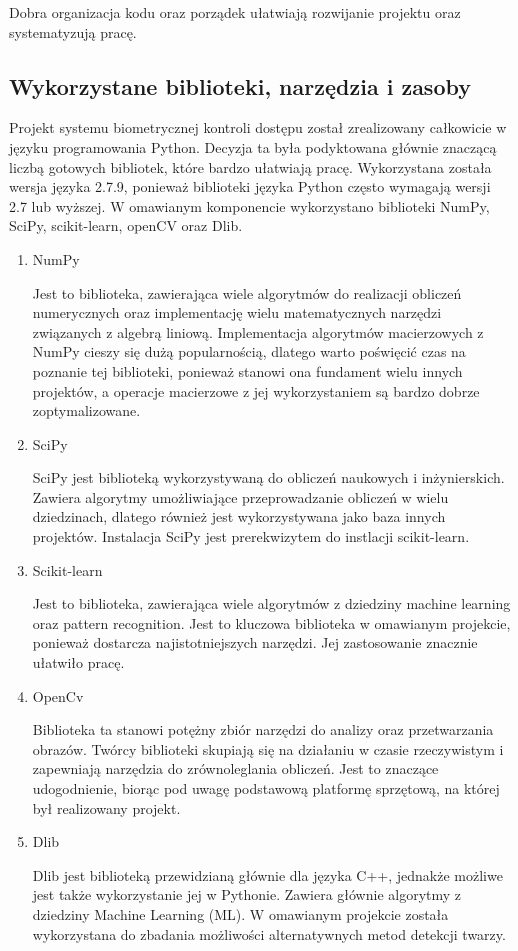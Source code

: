 \documentclass[oneside, eng]{mgr}
\begin{document}
Dobra organizacja kodu oraz porządek ułatwiają rozwijanie projektu oraz systematyzują pracę. 

\subsection{Wykorzystane biblioteki, narzędzia i zasoby}
Projekt systemu biometrycznej kontroli dostępu został zrealizowany całkowicie w języku programowania Python. Decyzja ta była podyktowana głównie znaczącą liczbą gotowych bibliotek, które bardzo ułatwiają pracę. Wykorzystana została wersja języka 2.7.9, ponieważ biblioteki języka Python często wymagają wersji 2.7 lub wyższej. W omawianym komponencie wykorzystano biblioteki NumPy, SciPy, scikit-learn, openCV oraz Dlib.
\begin{enumerate}
\item NumPy

Jest to biblioteka, zawierająca wiele algorytmów do realizacji obliczeń numerycznych oraz implementację wielu matematycznych narzędzi związanych z algebrą liniową. Implementacja algorytmów macierzowych z NumPy cieszy się dużą popularnością, dlatego warto poświęcić czas na poznanie tej biblioteki, ponieważ stanowi ona fundament wielu innych projektów, a operacje macierzowe z jej wykorzystaniem są bardzo dobrze zoptymalizowane.

\item SciPy

SciPy jest biblioteką wykorzystywaną do obliczeń naukowych i inżynierskich. Zawiera algorytmy umożliwiające przeprowadzanie obliczeń w wielu dziedzinach, dlatego również jest wykorzystywana jako baza innych projektów. Instalacja SciPy jest prerekwizytem do instlacji scikit-learn. 

\item Scikit-learn 

Jest to biblioteka, zawierająca wiele algorytmów z dziedziny machine learning oraz pattern recognition. Jest to kluczowa biblioteka w omawianym projekcie, ponieważ dostarcza najistotniejszych narzędzi. Jej zastosowanie znacznie ułatwiło pracę.

\item OpenCv

Biblioteka ta stanowi potężny zbiór narzędzi do analizy oraz przetwarzania obrazów. Twórcy biblioteki skupiają się na działaniu w czasie rzeczywistym i zapewniają narzędzia do zrównoleglania obliczeń. Jest to znaczące udogodnienie, biorąc pod uwagę podstawową platformę sprzętową, na której był realizowany projekt. 

\item Dlib 

Dlib jest biblioteką przewidzianą głównie dla języka C++, jednakże możliwe jest także wykorzystanie jej w Pythonie. Zawiera głównie algorytmy z dziedziny Machine Learning (ML). W omawianym projekcie została wykorzystana do zbadania możliwości alternatywnych metod detekcji twarzy.

\end{enumerate}
\end{document}
